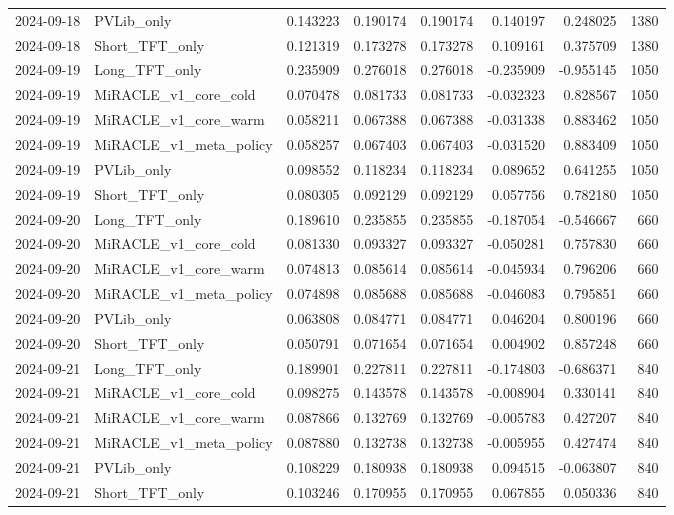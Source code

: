 \begin{tabular}{llrrrrrr}
2024-09-18 & PVLib_only & 0.143223 & 0.190174 & 0.190174 & 0.140197 & 0.248025 & 1380 \\
2024-09-18 & Short_TFT_only & 0.121319 & 0.173278 & 0.173278 & 0.109161 & 0.375709 & 1380 \\
2024-09-19 & Long_TFT_only & 0.235909 & 0.276018 & 0.276018 & -0.235909 & -0.955145 & 1050 \\
2024-09-19 & MiRACLE_v1_core_cold & 0.070478 & 0.081733 & 0.081733 & -0.032323 & 0.828567 & 1050 \\
2024-09-19 & MiRACLE_v1_core_warm & 0.058211 & 0.067388 & 0.067388 & -0.031338 & 0.883462 & 1050 \\
2024-09-19 & MiRACLE_v1_meta_policy & 0.058257 & 0.067403 & 0.067403 & -0.031520 & 0.883409 & 1050 \\
2024-09-19 & PVLib_only & 0.098552 & 0.118234 & 0.118234 & 0.089652 & 0.641255 & 1050 \\
2024-09-19 & Short_TFT_only & 0.080305 & 0.092129 & 0.092129 & 0.057756 & 0.782180 & 1050 \\
2024-09-20 & Long_TFT_only & 0.189610 & 0.235855 & 0.235855 & -0.187054 & -0.546667 & 660 \\
2024-09-20 & MiRACLE_v1_core_cold & 0.081330 & 0.093327 & 0.093327 & -0.050281 & 0.757830 & 660 \\
2024-09-20 & MiRACLE_v1_core_warm & 0.074813 & 0.085614 & 0.085614 & -0.045934 & 0.796206 & 660 \\
2024-09-20 & MiRACLE_v1_meta_policy & 0.074898 & 0.085688 & 0.085688 & -0.046083 & 0.795851 & 660 \\
2024-09-20 & PVLib_only & 0.063808 & 0.084771 & 0.084771 & 0.046204 & 0.800196 & 660 \\
2024-09-20 & Short_TFT_only & 0.050791 & 0.071654 & 0.071654 & 0.004902 & 0.857248 & 660 \\
2024-09-21 & Long_TFT_only & 0.189901 & 0.227811 & 0.227811 & -0.174803 & -0.686371 & 840 \\
2024-09-21 & MiRACLE_v1_core_cold & 0.098275 & 0.143578 & 0.143578 & -0.008904 & 0.330141 & 840 \\
2024-09-21 & MiRACLE_v1_core_warm & 0.087866 & 0.132769 & 0.132769 & -0.005783 & 0.427207 & 840 \\
2024-09-21 & MiRACLE_v1_meta_policy & 0.087880 & 0.132738 & 0.132738 & -0.005955 & 0.427474 & 840 \\
2024-09-21 & PVLib_only & 0.108229 & 0.180938 & 0.180938 & 0.094515 & -0.063807 & 840 \\
2024-09-21 & Short_TFT_only & 0.103246 & 0.170955 & 0.170955 & 0.067855 & 0.050336 & 840 \\

\end{tabular}
